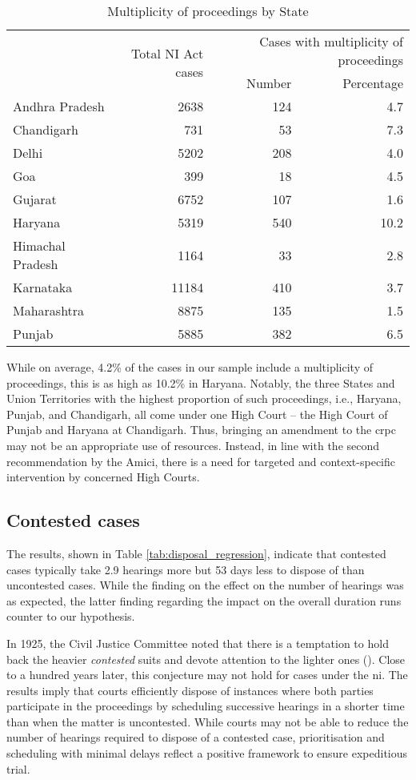 \documentclass[12pt,a4paper]{article}
\begin{document}
\begin{longtable}{@{}lrrr@{}}
\caption{Multiplicity of proceedings by State}\label{tab:state_multiplicity}\\
\toprule
\footnotesize
\multirow{2}{*}{State} & \multirow{2}{*}{Total NI Act cases} & \multicolumn{2}{p{4cm}}{Cases with multiplicity of proceedings} \\
\cmidrule{3-4}
& & Number & Percentage \\
\midrule
\endhead
Andhra Pradesh & 2638 & 124 & 4.7 \\
Chandigarh & 731 & 53 & 7.3 \\
Delhi & 5202 & 208 & 4.0 \\
Goa & 399 & 18 & 4.5 \\
Gujarat & 6752 & 107 & 1.6 \\
Haryana & 5319 & 540 & 10.2 \\
Himachal Pradesh & 1164 & 33 & 2.8 \\
Karnataka & 11184 & 410 & 3.7 \\
Maharashtra & 8875 & 135 & 1.5 \\
Punjab & 5885 & 382 & 6.5 \\
\bottomrule
\end{longtable}

While on average, 4.2\% of the cases in our sample include a multiplicity of proceedings, this is as high as 10.2\% in Haryana. Notably, the three States and Union Territories with the highest proportion of such proceedings, i.e., Haryana, Punjab, and Chandigarh, all come under one High Court -- the High Court of Punjab and Haryana at Chandigarh. Thus, bringing an amendment to the \gls{crpc} may not be an appropriate use of resources. Instead, in line with the second recommendation by the Amici, there is a need for targeted and context-specific intervention by concerned High Courts.

\subsection{Contested cases}
\label{sec:contested-cases}

The results, shown in Table \ref{tab:disposal_regression}, indicate that contested cases typically take 2.9 hearings more but 53 days less to dispose of than uncontested cases. While the finding on the effect on the number of hearings was as expected, the latter finding regarding the impact on the overall duration runs counter to our hypothesis.

In 1925, the Civil Justice Committee noted that there is a temptation to hold back the heavier \textit{contested} suits and devote attention to the lighter ones (\cite{cg1925_civiljustice}). Close to a hundred years later, this conjecture may not hold for cases under the \gls{ni}. The results imply that courts efficiently dispose of instances where both parties participate in the proceedings by scheduling successive hearings in a shorter time than when the matter is uncontested.
While courts may not be able to reduce the number of hearings required to dispose of a contested case, prioritisation and scheduling with minimal delays reflect a positive framework to ensure expeditious trial.
\end{document}
